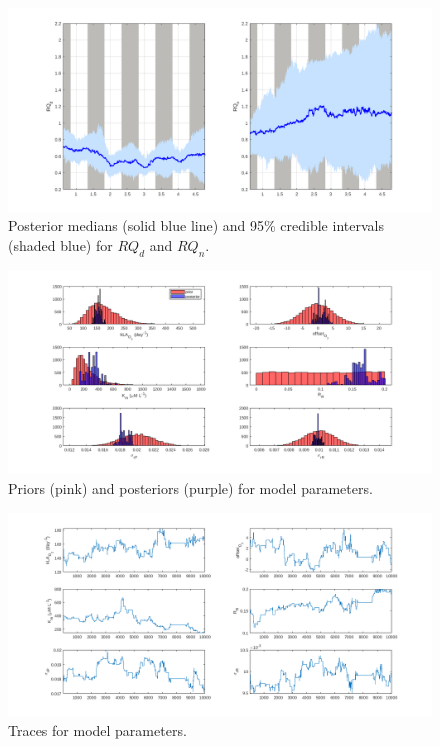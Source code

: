 \documentclass{ruthesis}
\begin{document}
\begin{figure}
	\centerline{\includegraphics[width=1.2\textwidth]{images_microalgae/plots_chris_offset/RQ_d_RQ_n}}
	\caption[.]{Posterior medians (solid blue line) and 95\% credible intervals (shaded blue) for $RQ_d$ and $RQ_n$.}
	\label{fig:micro_exp_offset_RQ_d_RQ_n}
\end{figure}



\begin{figure}
	\centerline{\includegraphics[width=1.3\textwidth]{images_microalgae/plots_chris_offset/modelparameters1}}
	\caption[.]{Priors (pink) and posteriors (purple) for model parameters.}
	\label{fig:micro_exp_offset_parameters_model}
\end{figure}

\begin{figure}
	\centerline{\includegraphics[width=1.3\textwidth]{images_microalgae/plots_chris_offset/modelparameters1_trace}}
	\caption[.]{Traces for model parameters.}
	\label{fig:micro_exp_offset_parameters_model2}
\end{figure}
\end{document}
